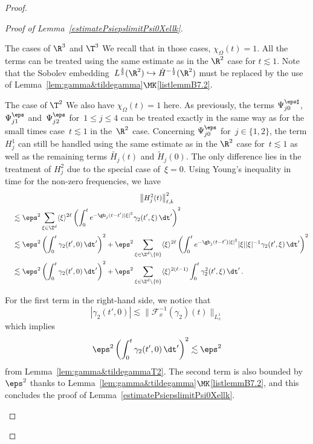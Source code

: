 \begin{proof}
\begin{proof}[{Proof of Lemma~\ref{estimatePsiepslimitPsi0Xellk}}]
\begin{step}{The cases of $\R^3$ and $\T^3$}
We recall that in those cases, $\chi_\Omega(t)=1$. All the terms can be treated using the same estimate as in the $\R^2$ case for $t \lesssim 1$. Note that the Sobolev embedding~$L^\frac43(\R^2)\hookrightarrow \dot H^{-\frac12}(\R^2)$ must be replaced by the use of Lemma~\ref{lem:gamma&tildegamma}$\MK$\eqref{listlemmB7.2}.
\end{step}

\begin{laststep}{The case of $\T^2$}
We also have $\chi_\Omega(t)=1$ here. As previously, the terms $ \Psi^{\eps\sharp}_{j0}$, $ \Psi^\eps_{j1}$ and~$ \Psi^\eps_{j2}$ for~$1 \le j \le 4$ can be treated exactly in the same way as for the small times case~$t \lesssim 1$ in the~$\R^2$ case. Concerning $\Psi^\eps_{j0}$ for~$j\in\{1,2\}$, the term $H^1_j$ can still be handled using the same estimate as in the $\R^2$ case for~$t \lesssim 1$ as well as the remaining terms $\tilde{H_j}(t)$ and $\tilde H_j(0)$. The only difference lies in the treatment of $H^2_j$ due to the special case of~$\xi=0$. 
Using Young's inequality in time for the non-zero frequencies, we have
\begin{multline*}
\left\|H^2_j(t)\right\|^2_{\ell,k} \\
\begin{aligned}
&\quad \lesssim \eps^2 \sum_{\xi \in \Z^d} \langle \xi \rangle^{2\ell} \left(\int_0^t e^{-\gb_j(t-t')|\xi|^2} {\gamma_2}({t'},\xi)\, \dt' \right)^2 \\
&\quad \lesssim \eps^2 \left(\int_0^t {\gamma_2}({t'},0)\, \dt' \right)^2 + \eps^2 \sum_{\xi \in \Z^d \setminus \{0\}} \langle \xi \rangle^{2\ell} \left(\int_0^t e^{-\gb_j(t-t')|\xi|^2} |\xi| |\xi|^{-1} {\gamma_2}({t'},\xi)\, \dt' \right)^2 \\
&\quad \lesssim \eps^2 \left(\int_0^t {\gamma_2}({t'},0)\, \dt' \right)^2 + \eps^2 \sum_{\xi \in \Z^d \setminus \{0\}} \langle \xi \rangle^{2(\ell-1)} \int_0^t \gamma_2^2({t'},\xi)\, \dt' \,.
\end{aligned}
\end{multline*}

\goodbreak
For the first term in the right-hand side, we notice that
\[
| {\gamma_2}({t'},0)| \lesssim {\|\mathcal{F}_x^{-1}(\gamma_2)(t)\|_{L^1_x}}
\]
which implies
\[
\eps^2 \left(\int_0^t {\gamma_2}({t'},0)\, \dt' \right)^2\lesssim \eps^2
\]
from Lemma~\ref{lem:gamma&tildegammaT2}. The second term is also bounded by $\eps^2$ thanks to Lemma~\ref{lem:gamma&tildegamma}$\MK$\eqref{listlemmB7.2}, and this concludes the proof of Lemma~\ref{estimatePsiepslimitPsi0Xellk}.
\end{laststep}
\let\qed\relax
\end{proof} %


\end{proof}
